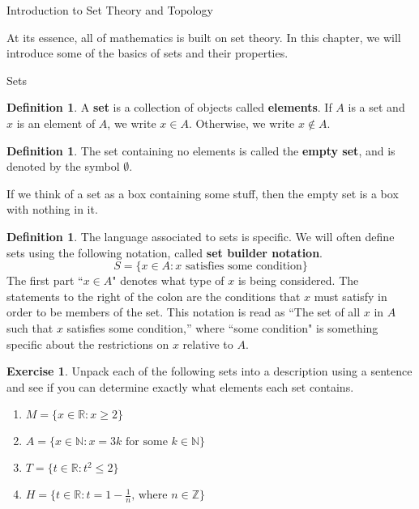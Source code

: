 \documentclass[11pt]{article}
\theoremstyle{definition}
\newtheorem{definition}[theorem]{Definition}
\newtheorem{exercise}[theorem]{Exercise}
\begin{document}
\addtocounter{section}{1}

\begin{section}{Introduction to Set Theory and Topology}

At its essence, all of mathematics is built on set theory.  In this chapter, we will introduce some of the basics of sets and their properties.

\begin{subsection}{Sets} 

\begin{definition}
A \textbf{set} is a collection of objects called \textbf{elements}. If $A$ is a set and $x$ is an element of $A$, we write
$x\in A$. Otherwise, we write $x\notin A$.
\end{definition}

\begin{definition}
The set containing no elements is called the \textbf{empty set}, and is denoted by the symbol $\emptyset$.
\end{definition}

If we think of a set as a box containing some stuff, then the empty set is a box with nothing in it.

\begin{definition} 
The language associated to sets is specific.  We will often define sets using the following notation, called \textbf{set builder notation}.
\[
S=\{x \in A: x \mbox{ satisfies some condition}\}
\]
The first part ``$x \in A$" denotes what type of $x$ is being considered.  The statements to the right of the colon are the conditions that $x$ must satisfy in order to be members of the set.  This notation is read as ``The set of all $x$ in $A$ such that $x$ satisfies some condition,'' where ``some condition" is something specific about the restrictions on $x$ relative to $A$.
\end{definition}

\begin{exercise}
Unpack each of the following sets into a description using a sentence and see if you can determine exactly what elements each set contains.
\begin{enumerate}
\item $M=\{x \in \mathbb{R} :  x \geq 2 \}$
\item $A=\{x \in \mathbb{N} : x = 3k \mbox{ for some } k\in \mathbb{N} \}$
\item $T=\{t \in \mathbb{R} : t^2 \leq 2 \}$
\item $H=\{t \in \mathbb{R} : t = 1 - \frac{1}{n} \mbox{, where } n \in \mathbb{Z} \}$
\end{enumerate}
\end{exercise}


\end{subsection}
\end{section}
\end{document}
